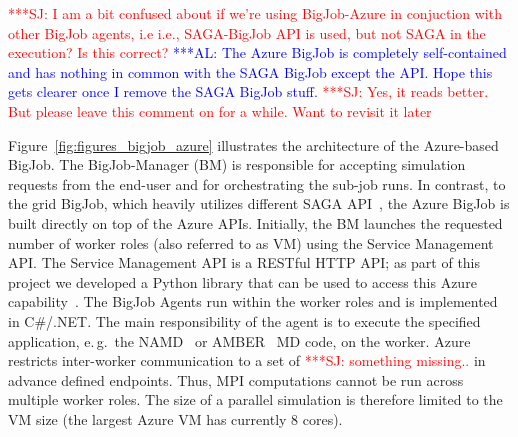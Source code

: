 \documentclass[conference,final]{IEEEtran}
\newcommand{\alnote}[1]{ {\textcolor{blue} { ***AL: #1 }}}
\newcommand{\jhanote}[1]{ {\textcolor{red} { ***SJ: #1 }}}
\newcommand{\alnote}[1]{}
\newcommand{\jhanote}[1]{}
\begin{document}

\jhanote{I am a bit confused about if we're using BigJob-Azure in
  conjuction with other BigJob agents, i.e i.e., SAGA-BigJob API is
  used, but not SAGA in the execution?  Is this correct?}  \alnote{The
  Azure BigJob is completely self-contained and has nothing in common
  with the SAGA BigJob except the API. Hope this gets clearer once I
  remove the SAGA BigJob stuff.}\jhanote{Yes, it reads better. But
  please leave this comment on for a while. Want to revisit it later}

Figure~\ref{fig:figures_bigjob_azure} illustrates the architecture of
the Azure-based BigJob. The BigJob-Manager (BM) is responsible for
accepting simulation requests from the end-user and for orchestrating
the sub-job runs.  In contrast, to the grid BigJob, which heavily
utilizes different SAGA API~\cite{saga_url}, the Azure BigJob is built
directly on top of the Azure APIs. Initially, the BM launches the
requested number of worker roles (also referred to as VM) using the
Service Management API.  The Service Management API is a RESTful HTTP
API; as part of this project we developed a Python library that can be
used to access this Azure capability~\cite{azure-service-python}. The
BigJob Agents run within the worker roles and is implemented in
C\#/.NET. The main responsibility of the agent is to execute the
specified application, e.\,g.\ the NAMD~\cite{Phillips:2005gd} or
AMBER~\cite{cheatham-5} MD code, on the worker. Azure restricts
inter-worker communication to a set of \jhanote{something missing..}in
advance defined endpoints. Thus, MPI computations cannot be run across
multiple worker roles. The size of a parallel simulation is therefore
limited to the VM size (the largest Azure VM has currently 8 cores).
\end{document}
